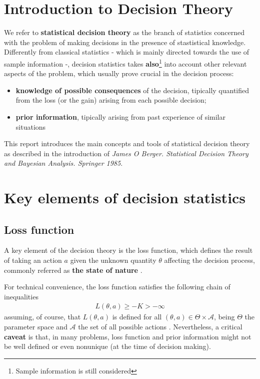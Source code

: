 \documentclass{article}
\newcommand{\loss}{L(\theta, a)}
\begin{document}
	
	
	\section{Introduction to Decision Theory}
	We refer to \textbf{statistical decision theory} as the branch of statistics concerned with the problem of making decisions in the presence of stastistical knowledge.
	Differently from classical statistics - which is mainly directed towards the use of sample information -, decision statistics takes \textbf{also}\footnote{Sample information is still considered} into account other relevant aspects of the problem, which usually prove crucial in the decision process:
	\begin{itemize}
		\item \textbf{knowledge of possible consequences} of the decision, tipically quantified from the loss (or the gain) arising from each possible decision;
		\item \textbf{prior information}, tipically arising from past experience of similar situations
	\end{itemize}
	This report introduces the main concepts and tools of statistical decision theory as described in the introduction of \textit{James O Berger. Statistical Decision Theory and Bayesian 
	Analysis. Springer 1985}.
	
	\section{Key elements of decision statistics}
	\subsection{Loss function}
		A key element of the decision theory is the loss function, which defines the result of taking an action $a$ given the unknown quantity $\theta$ affecting the decision process, commonly 
	referred as \textbf{the state of nature} . 
	
	For technical convenience, the loss function satisfies the following chain of inequalities
	\begin{align*}
		\loss \ge -K > - \infty
	\end{align*} 
	assuming, of course, that $\loss$ is defined for all $(\theta, a) \in \Theta \times \mathcal{A}$, being $\Theta$ the parameter space and $\mathcal{A}$ the set of all possible actions . Nevertheless, a critical \textbf{caveat} is that, in many problems, loss function and prior information might not be well defined or even nonunique (at the time of decision making).
	 
\end{document}
